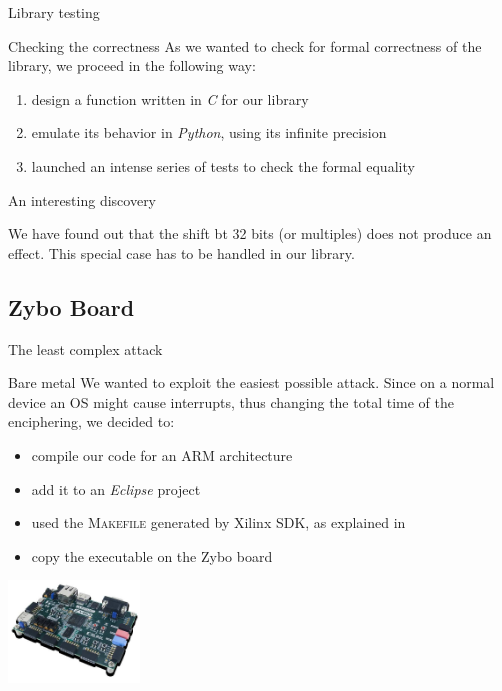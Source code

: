 \documentclass[aspectratio=169]{beamer}
\begin{document}
\begin{frame}{Library testing}
  \begin{block}{Checking the correctness}
    As we wanted to check for formal correctness of the library, we proceed in the following way:
    \begin{enumerate}
      \pause \item design a function written in \textit{C} for our library
      \pause \item emulate its behavior in \textit{Python}, using its infinite precision
      \pause \item launched an intense series of tests to check the formal equality
    \end{enumerate}
  \end{block}

  \pause
  \begin{alert}{An interesting discovery}

    We have found out that the shift bt 32 bits (or multiples) does not produce an effect. This special case has to be handled in our library.
  \end{alert}
\end{frame}

\subsection{Zybo Board}
\begin{frame}{The least complex attack}
	\begin{block}{Bare metal}
		We wanted to exploit the easiest possible attack. Since on a normal device an OS might cause interrupts, thus changing the total time of the enciphering, we decided to:
		\begin{itemize}
			\pause \item compile our code for an ARM architecture
			\pause \item add it to an \textit{Eclipse} project
			\pause \item used the \textsc{Makefile} generated by Xilinx SDK, as explained in \cite{xilinx2015zynq}
			\pause \item copy the executable on the Zybo board
		\end{itemize}
    \begin{center}
      \includegraphics[width=3.5cm]{./graphics/zybo}
    \end{center}
	\end{block}
\end{frame}
\end{document}
